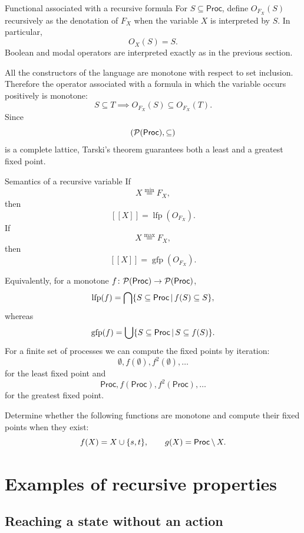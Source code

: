 \documentclass[a4paper]{article}
\newcommand{\Proc}{\mathsf{Proc}}
\newcommand{\sem}[1]{[\![#1]\!]}
\newcommand{\lfp}{\operatorname{lfp}}
\newcommand{\gfp}{\operatorname{gfp}}
\begin{document}
\begin{snippetdefinition}{Functional associated with a recursive formula}
    For \(S\subseteq\Proc\), define \(O_{F_X}(S)\) recursively as the denotation of \(F_X\) when the variable \(X\) is interpreted by \(S\).
    In particular,
    \[
        O_X(S)=S.
    \]
    Boolean and modal operators are interpreted exactly as in the previous section.
\end{snippetdefinition}

All the constructors of the language are monotone with respect to set inclusion.
Therefore the operator associated with a formula in which the variable occurs positively is monotone:
\[
    S\subseteq T
    \implies
    O_{F_X}(S)\subseteq O_{F_X}(T).
\]
Since
\[
    (\powerset(\Proc),\subseteq)
\]
is a complete lattice, Tarski's theorem guarantees both a least and a greatest fixed point.

\begin{snippetdefinition}{Semantics of a recursive variable}
    If
    \[
        X\overset{\min}{=}F_X,
    \]
    then
    \[
        \sem{X}=\lfp(O_{F_X}).
    \]
    If
    \[
        X\overset{\max}{=}F_X,
    \]
    then
    \[
        \sem{X}=\gfp(O_{F_X}).
    \]
\end{snippetdefinition}

Equivalently, for a monotone \(f\colon\powerset(\Proc)\fromto\powerset(\Proc)\),
\[
    \lfp(f)
    =
    \bigcap\{S\subseteq\Proc\suchthat f(S)\subseteq S\},
\]
whereas
\[
    \gfp(f)
    =
    \bigcup\{S\subseteq\Proc\suchthat S\subseteq f(S)\}.
\]
For a finite set of processes we can compute the fixed points by iteration:
\[
    \emptyset,
f(\emptyset),
f^2(\emptyset),\ldots
\]
for the least fixed point and
\[
    \Proc,
f(\Proc),
f^2(\Proc),\ldots
\]
for the greatest fixed point.

\begin{snippetexercise}{}
    Determine whether the following functions are monotone and compute their fixed points when they exist:
    \[
        f(X)=X\union\{s,t\},
        \qquad
        g(X)=\Proc\difference X.
    \]
\end{snippetexercise}

\section{Examples of recursive properties}

\subsection{Reaching a state without an action}
\end{document}
